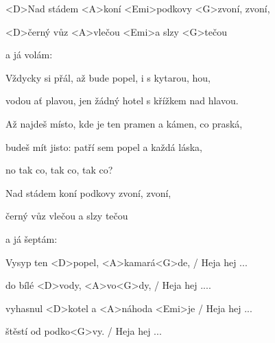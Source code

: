 

\zs
<D>Nad stádem <A>koní <Emi>podkovy <G>zvoní, zvoní,

<D>černý vůz <A>vlečou <Emi>a slzy <G>tečou

a já volám:
\ks

\zs
{}
\ks

\zs
Vždycky si přál, až bude popel, i s kytarou, hou,

vodou ať plavou, jen žádný hotel s křížkem nad hlavou.
\ks

\zs
Až najdeš místo, kde je ten pramen
a kámen, co praská,

budeš mít jisto: patří sem popel
a každá láska,

no tak co, tak co, tak co?
\ks

\zs
Nad stádem koní podkovy zvoní, zvoní,

černý vůz vlečou a slzy tečou

a já šeptám:
\ks

\zs
{}
\ks

\zs
Vysyp ten <D>popel, <A>kamará<G>de, / Heja hej ...

do bílé <D>vody, <A>vo<G>dy, / Heja hej ....

vyhasnul <D>kotel a <A>náhoda <Emi>je / Heja hej ...

štěstí od podko<G>vy. / Heja hej ...
\ks

\kp
